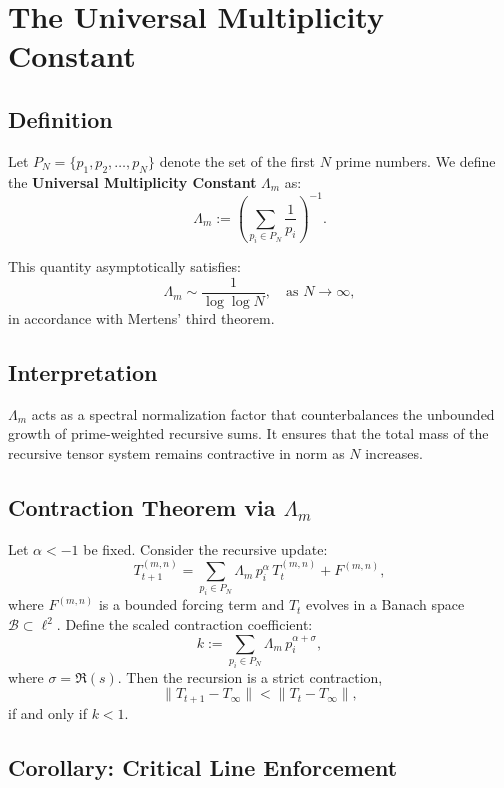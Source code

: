 \documentclass[12pt]{article}
\begin{document}
\section{The Universal Multiplicity Constant}

\subsection*{Definition}

Let $P_N = \{p_1, p_2, \dots, p_N\}$ denote the set of the first $N$ prime numbers. We define the \textbf{Universal Multiplicity Constant} $\Lambda_m$ as:
\[
\Lambda_m := \left( \sum_{p_i \in P_N} \frac{1}{p_i} \right)^{-1}.
\]

This quantity asymptotically satisfies:
\[
\Lambda_m \sim \frac{1}{\log \log N}, \quad \text{as } N \to \infty,
\]
in accordance with Mertens' third theorem.

\subsection*{Interpretation}

$\Lambda_m$ acts as a spectral normalization factor that counterbalances the unbounded growth of prime-weighted recursive sums. It ensures that the total mass of the recursive tensor system remains contractive in norm as $N$ increases.

\subsection*{Contraction Theorem via $\Lambda_m$}

\begin{theorem}
Let $\alpha < -1$ be fixed. Consider the recursive update:
\[
T_{t+1}^{(m,n)} = \sum_{p_i \in P_N} \Lambda_m \, p_i^{\alpha} \, T_t^{(m,n)} + F^{(m,n)},
\]
where $F^{(m,n)}$ is a bounded forcing term and $T_t$ evolves in a Banach space $\mathcal{B} \subset \ell^2$. Define the scaled contraction coefficient:
\[
k := \sum_{p_i \in P_N} \Lambda_m \, p_i^{\alpha + \sigma},
\]
where $\sigma = \Re(s)$. Then the recursion is a strict contraction,
\[
\|T_{t+1} - T_\infty\| < \|T_t - T_\infty\|,
\]
if and only if $k < 1$.
\end{theorem}

\subsection*{Corollary: Critical Line Enforcement}
\end{document}
